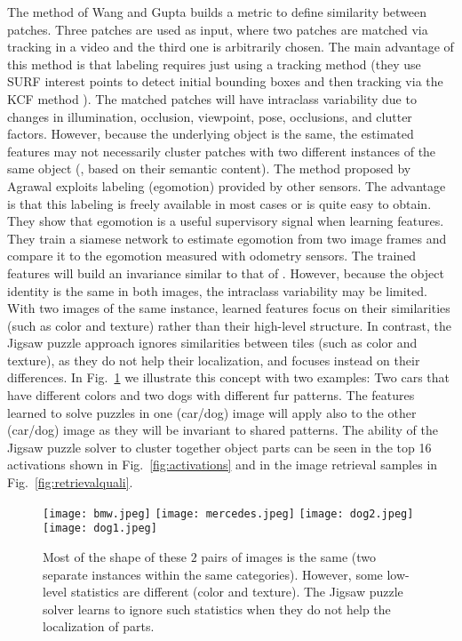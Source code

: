 \documentclass[runningheads]{llncs}
\begin{document}
The method of Wang and Gupta \cite{Gupta15} builds a metric to define similarity between patches. Three patches are used as input, where two patches are matched via tracking in a video and the third one is arbitrarily chosen. The main advantage of this method is that labeling requires just using a tracking method (they use SURF interest points to detect initial bounding boxes and then tracking via the KCF method \cite{HenriquesCMB15}). The matched patches will have intraclass variability due to changes in illumination, occlusion, viewpoint, pose, occlusions, and clutter factors. However, because the underlying object is the same, the estimated features may not necessarily cluster patches with two different instances of the same object (\ie, based on their semantic content).
The method proposed by Agrawal \etal \cite{agrawalCM15} exploits labeling (egomotion) provided by other sensors. The advantage is that this labeling is freely available in most cases or is quite easy to obtain. They show that egomotion is a useful supervisory signal when learning features. They train a siamese network to estimate egomotion from two image frames and compare it to the egomotion measured with odometry sensors. The trained features will build an invariance similar to that of \cite{Gupta15}. However, because the object identity is the same in both images, the intraclass variability may be limited. With two images of the same instance, learned features focus on their similarities (such as color and texture) rather than their high-level structure. 
In contrast, the Jigsaw puzzle approach ignores similarities between tiles (such as color and texture), as they do not help their localization, and focuses instead on their differences. In Fig.~\ref{fig:parts} we illustrate this concept with two examples: Two cars that have different colors and two dogs with different fur patterns. The features learned to solve puzzles in one (car/dog) image will apply also to the other (car/dog) image as they will be invariant to shared patterns. The ability of the Jigsaw puzzle solver to cluster together object parts can be seen in the top 16 activations shown in Fig.~\ref{fig:activations} and in the image retrieval samples in Fig.~\ref{fig:retrievalquali}.

\begin{figure}[t]
\centering
\texttt{[image: bmw.jpeg]}
\texttt{[image: mercedes.jpeg]}
\texttt{[image: dog2.jpeg]}
\texttt{[image: dog1.jpeg]}
 \caption{Most of the shape of these $2$ pairs of images is the same (two separate instances within the same categories). However, some low-level statistics are different (color and texture). The Jigsaw puzzle solver learns to ignore such statistics when they do not help the localization of parts.
 \label{fig:parts}}
\end{figure}
\end{document}
